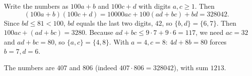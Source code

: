 Write the numbers as $100a+b$ and $100c+d$ with digits $a,c\ge1$. Then
\[(100a+b)(100c+d)=10000ac+100(ad+bc)+bd=328042.\]
Since $bd\le81<100$, $bd$ equals the last two digits, $42$, so $\{b,d\}=\{6,7\}$. Then $100ac+(ad+bc)=3280$. Because $ad+bc\le 9\cdot7+9\cdot6=117$, we need $ac=32$ and $ad+bc=80$, so $\{a,c\}=\{4,8\}$. With $a=4,c=8$: $4d+8b=80$ forces $b=7,d=6$.

The numbers are $407$ and $806$ (indeed $407\cdot806=328042$), with sum $\boxed{1213}$.
